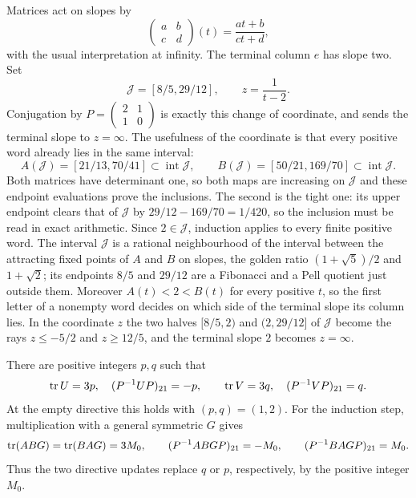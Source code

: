 Matrices act on slopes by
$$
 \begin{pmatrix}a&b\\c&d\end{pmatrix}(t)
 =\frac{at+b}{ct+d},
$$
with the usual interpretation at infinity. The terminal column $e$
has slope two. Set
\begin{equation}\label{eq:decoder-interval}
 \mathcal J=[8/5,29/12],\qquad z=\frac1{t-2}.
\end{equation}
Conjugation by $P=\left(\begin{smallmatrix}2&1\\1&0\end{smallmatrix}\right)$
is exactly this change of coordinate, and sends the terminal slope to
$z=\infty$. The usefulness of the coordinate is that every positive
word already lies in the same interval:
$$
 A(\mathcal J)=[21/13,70/41]\subset\operatorname{int}\mathcal J,\qquad
 B(\mathcal J)=[50/21,169/70]\subset\operatorname{int}\mathcal J.
$$
Both matrices have determinant one, so both maps are increasing on
$\mathcal J$ and these endpoint evaluations prove the inclusions. The
second is the tight one: its upper endpoint clears that of $\mathcal J$ by
$29/12-169/70=1/420$, so the inclusion must be read in exact arithmetic.
Since $2\in\mathcal J$, induction applies to every finite positive word.
The interval $\mathcal J$ is a rational neighbourhood of the interval between the
attracting fixed points of $A$ and $B$ on slopes, the golden ratio $(1+\sqrt5)/2$ and
$1+\sqrt2$; its endpoints $8/5$ and $29/12$ are a Fibonacci and a Pell quotient just
outside them. Moreover $A(t)<2<B(t)$ for every positive $t$, so the first letter of a
nonempty word decides on which side of the terminal slope its column lies. In the
coordinate $z$ the two halves $[8/5,2)$ and $(2,29/12]$ of $\mathcal J$ become the rays
$z\leqslant-5/2$ and $z\geqslant12/5$, and the terminal slope $2$ becomes $z=\infty$.

There are positive integers $p,q$ such that
\begin{equation}\label{eq:decoder-trace-column}
 \operatorname{tr} U=3p,\quad (P^{-1}UP)_{21}=-p,\qquad
 \operatorname{tr} V=3q,\quad (P^{-1}VP)_{21}=q.
\end{equation}
At the empty directive this holds with $(p,q)=(1,2)$.
For the induction step, multiplication with a general symmetric $G$
gives
$$
 \operatorname{tr}(ABG)=\operatorname{tr}(BAG)=3M_0,\qquad
 (P^{-1}ABGP)_{21}=-M_0,\qquad
 (P^{-1}BAGP)_{21}=M_0.
$$
Thus the two directive updates replace $q$ or $p$, respectively,
by the positive integer $M_0$.

